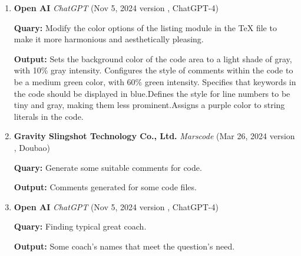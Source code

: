 \documentclass[12pt]{article}
\begin{document}
\begin{enumerate}
    \vspace{0.3cm}
    \item \textbf{Open AI}  \textit{ChatGPT} (Nov 5, 2024 version , ChatGPT-4)
    \par \textbf{Quary:} Modify the color options of the listing module in the TeX file to make it more harmonious and aesthetically pleasing.
    \par \textbf{Output:} Sets the background color of the code area to a light shade of gray, with 10\% gray intensity. Configures the style of comments within the code to be a medium green color, with 60\% green intensity. Specifies that keywords in the code should be displayed in blue.Defines the style for line numbers to be tiny and gray, making them less prominent.Assigns a purple color to string literals in the code.

    \vspace{0.3cm}
    \item \textbf{Gravity Slingshot Technology Co., Ltd.}  \textit{Marscode} (Mar 26, 2024 version , Doubao)
    \par \textbf{Quary:} Generate some suitable comments for code.
    \par \textbf{Output:} Comments generated for some code files.

    \vspace{0.3cm}
    \item \textbf{Open AI}  \textit{ChatGPT} (Nov 5, 2024 version , ChatGPT-4)
    \par \textbf{Quary:} Finding typical great coach.
    \par \textbf{Output:} Some coach's names that meet the question's need.


\end{enumerate}
\end{document}
